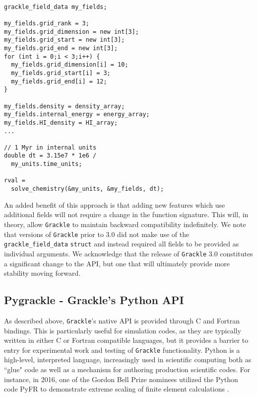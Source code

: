 \vspace{0.5cm}
\begin{minipage}[b]{0.5\linewidth}
\begin{verbatim}

grackle_field_data my_fields;

my_fields.grid_rank = 3;
my_fields.grid_dimension = new int[3];
my_fields.grid_start = new int[3];
my_fields.grid_end = new int[3];
for (int i = 0;i < 3;i++) {
  my_fields.grid_dimension[i] = 10;
  my_fields.grid_start[i] = 3;
  my_fields.grid_end[i] = 12;
}

my_fields.density = density_array;
my_fields.internal_energy = energy_array;
my_fields.HI_density = HI_array;
...

// 1 Myr in internal units
double dt = 3.15e7 * 1e6 /
  my_units.time_units;

rval =
  solve_chemistry(&my_units, &my_fields, dt);

\end{verbatim}
\end{minipage}

An added benefit of this approach is that adding new
features which use additional fields will not require a change in the
function signature.  This will, in theory, allow \texttt{Grackle} to maintain
backward compatibility indefinitely.  We note that versions of \texttt{Grackle}
prior to 3.0 did not make use of the \texttt{grackle\_field\_data}
\texttt{struct} and instead required all fields to be provided as
individual arguments.  We acknowledge that the release of
\texttt{Grackle} 3.0 constitutes a significant change to the API, but
one that will ultimately provide more stability moving forward.

\subsection{Pygrackle - Grackle's Python API}

As described above, \texttt{Grackle}'s native API is provided through C and Fortran
bindings.  This is particularly useful for simulation codes, as they are
typically written in either C or Fortran compatible languages, but it provides
a barrier to entry for experimental work and testing of \texttt{Grackle} functionality.
Python is a high-level, interpreted language, increasingly used in scientific
computing both as ``glue" code as well as a mechanism for authoring production
scientific codes.  For instance, in 2016, one of the Gordon Bell Prize nominees
utilized the Python code PyFR to demonstrate extreme scaling of finite element
calculations \citep{pyfr}.

